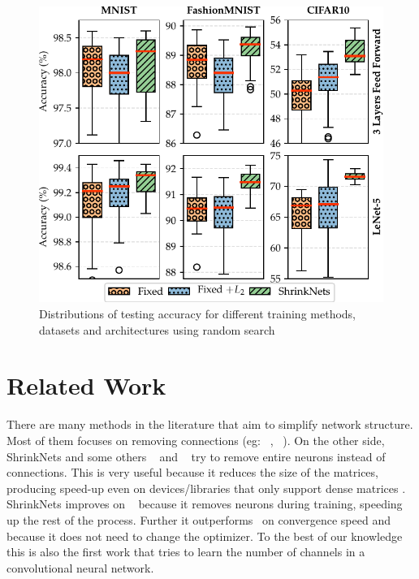 \documentclass[sigconf]{acmart}
\begin{document}
\begin{figure}
\vspace{-.2in}
\begin{center}
  \includegraphics[width=\columnwidth]{hyper_opt}
  \vspace{-.25in}
\caption{Distributions of testing accuracy for different training methods, datasets and architectures using random search\label{hyper_opt_res}}
\vspace{-.2in}
\end{center}
\end{figure}

\section{Related Work}

There are many methods in the literature that aim to simplify network
structure. Most of them focuses on removing connections (eg: ~\cite{Cun},
~\cite{Han2015}). On the other side, ShrinkNets and some others
~\cite{Scardapane2017} and ~\cite{Philipp} try to remove entire neurons instead
of connections. This is very useful because it reduces the size of the matrices,
producing speed-up even on devices/libraries that only support dense matrices
. ShrinkNets improves on
~\cite{Scardapane2017} because it removes neurons during training, speeding up
the rest of the process. Further it outperforms~\cite{Philipp} on convergence
speed and because it does not need to change the optimizer. To the best of our
knowledge this is also the first work that tries to learn the number of channels
in a convolutional neural network.
\end{document}
